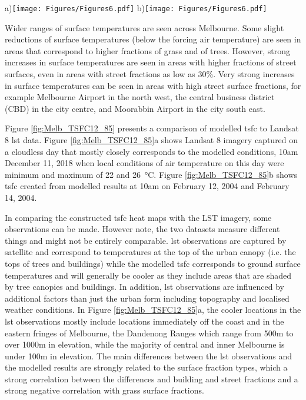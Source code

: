 \documentclass[final,3p,times,authoryear]{elsarticle}
\newcommand{\add}[1]{\textcolor{black}{#1}}
\begin{document}
\begin{figure*}
\centering
a)\texttt{[image: Figures/Figures6.pdf]}
b)\texttt{[image: Figures/Figures6.pdf]}
\caption{\bf a) \gls{tcan} and b) \gls{utci} heatmaps on February 12, 2004 at 2pm generated by matching the closest matching parameters of surface fractions and average heights for each 100$\times$100m location in Melbourne from 9814 modelled scenario results (in \SI{}{\degreeCelsius}). }
 \label{fig:TaMelb}  \label{fig:utciMelb}
\end{figure*}


Wider ranges of surface temperatures are seen across Melbourne. Some slight reductions of surface temperatures (below the forcing air temperature) are seen in areas that correspond to higher fractions of grass and of trees. However, strong increases in surface temperatures \add{are seen} in areas with higher fractions of street surfaces, even in areas with street fractions as low as 30\%. Very strong increases in surface temperatures can be seen in areas with high street surface fractions, for example Melbourne Airport in the north west, the central business district (CBD) in the city centre, and Moorabbin Airport in the city south east.

Figure \ref{fig:Melb_TSFC12_85} presents a comparison of modelled \gls{tsfc} to Landsat 8 \gls{lst} data. Figure \ref{fig:Melb_TSFC12_85}a shows Landsat 8 imagery captured on a cloudless day that mostly closely corresponds to the modelled conditions, 10am December 11, 2018 when local conditions of air temperature on this day were minimum and maximum of 22 and 26\SI{}{\degreeCelsius}. Figure \ref{fig:Melb_TSFC12_85}b shows \gls{tsfc} created from modelled results at 10am on February 12, 2004 and February 14, 2004. 

In comparing the constructed \gls{tsfc} heat maps with the LST imagery, some observations can be made. However note, the two datasets measure different things and might not be entirely comparable. \gls{lst} observations are captured by satellite and correspond to temperatures at the top of the urban canopy (i.e. the tops of trees and buildings) while the modelled \gls{tsfc} corresponds to ground surface temperatures and will generally be cooler as they include areas that are shaded by tree canopies and buildings. In addition, \gls{lst} observations are influenced by additional factors than just the urban form including topography and localised weather conditions. In Figure \ref{fig:Melb_TSFC12_85}a, the cooler locations in the \gls{lst} observations mostly include locations immediately off the coast and in the eastern fringes of Melbourne, the Dandenong Ranges which range from 500m to over 1000m in elevation, while the majority of central and inner Melbourne is under 100m in elevation. The main differences between the \gls{lst} observations and the modelled results are strongly related to the surface fraction types, which a strong correlation between the differences and building and street fractions and a strong negative correlation with grass surface fractions. 
\end{document}
